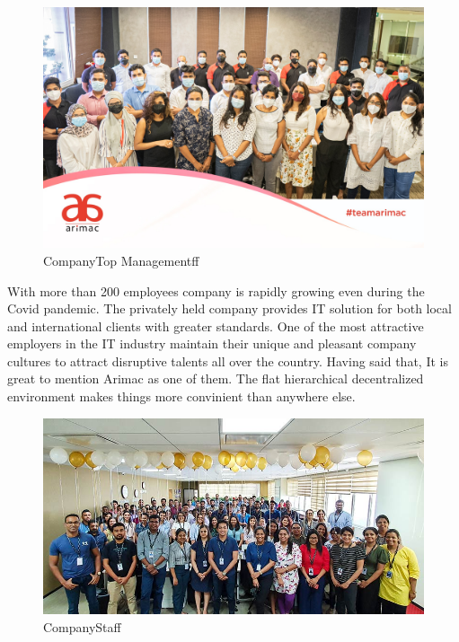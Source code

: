 \documentclass[twoside,12pt,times,onecolumn,a4paper]{report}
\begin{document}
\begin{figure}[H]
  \centering
   \includegraphics[width=12cm]{staff}
  \caption{CompanyTop Managementff}
\end{figure}

With more than 200 employees company is rapidly growing even during the Covid pandemic. The privately held company provides IT solution for both local and international clients with greater standards. One of the most attractive employers in the IT industry maintain their unique and pleasant company cultures to attract disruptive talents all over the country. Having said that, It is great to mention Arimac as one of them. The flat hierarchical decentralized environment makes things more convinient than anywhere else. 

\begin{figure}[H]
  \centering
   \includegraphics[width=12cm]{staff2}
  \caption{CompanyStaff}
\end{figure}

\end{document}
